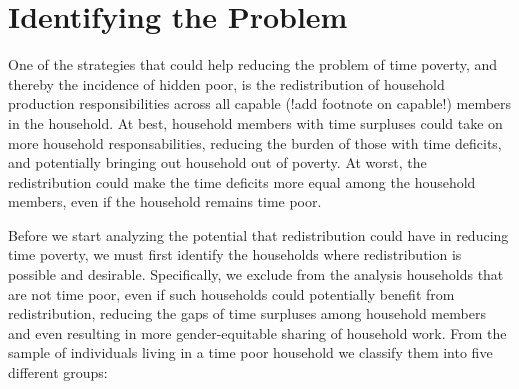 \documentclass[
  11pt,
]{article}
\begin{document}
\section{Identifying the Problem}\label{sec-problem}

One of the strategies that could help reducing the problem of time
poverty, and thereby the incidence of hidden poor, is the redistribution
of household production responsibilities across all capable (!add
footnote on capable!) members in the household. At best, household
members with time surpluses could take on more household
responsabilities, reducing the burden of those with time deficits, and
potentially bringing out household out of poverty. At worst, the
redistribution could make the time deficits more equal among the
household members, even if the household remains time poor.

Before we start analyzing the potential that redistribution could have
in reducing time poverty, we must first identify the households where
redistribution is possible and desirable. Specifically, we exclude from
the analysis households that are not time poor, even if such households
could potentially benefit from redistribution, reducing the gaps of time
surpluses among household members and even resulting in more
gender-equitable sharing of household work. From the sample of
individuals living in a time poor household we classify them into five
different groups:
\end{document}
